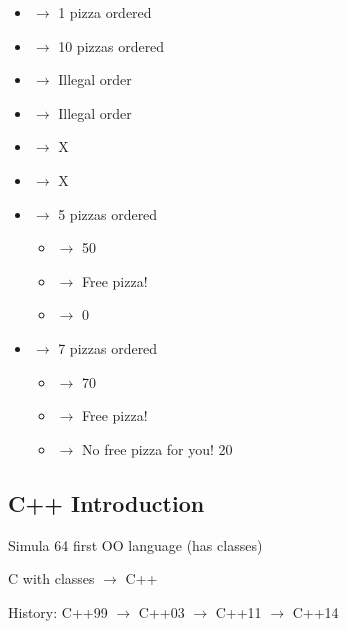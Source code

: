 \begin{itemize}
      \item {} $ \rightarrow $ 1 pizza ordered
      \item {} $ \rightarrow $ 10 pizzas ordered
      \item {} $ \rightarrow $ Illegal order
      \item {} $ \rightarrow $ Illegal order
      \item {} $ \rightarrow $ X
      \item {} $ \rightarrow $ X
      \item {} $ \rightarrow $ 5 pizzas ordered
            \begin{itemize}
                  \item {} $ \rightarrow $ 50
                  \item {} $ \rightarrow $ Free pizza!
                  \item {} $ \rightarrow $ 0
            \end{itemize}
      \item {} $ \rightarrow $ 7 pizzas ordered
            \begin{itemize}
                  \item {} $ \rightarrow $ 70
                  \item {} $ \rightarrow $ Free pizza!
                  \item {} $ \rightarrow $ No free pizza for you! 20
            \end{itemize}
\end{itemize}

\subsection{C++ Introduction}
Simula 64 \textrightarrow{} first OO language (has classes)

C with classes $ \rightarrow $ C++

History: C++99 $ \rightarrow $ C++03 $ \rightarrow $ C++11 $ \rightarrow $ C++14

